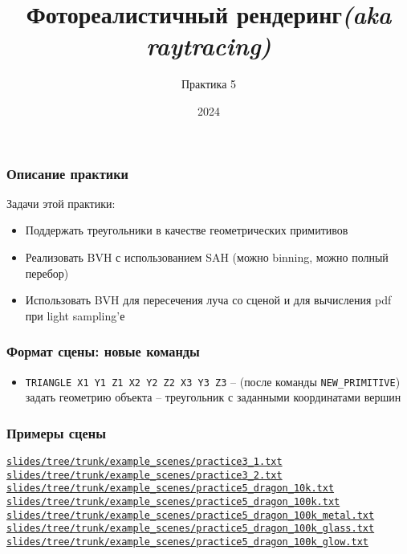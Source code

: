 \documentclass[10pt,handout]{beamer}
\title{Фотореалистичный рендеринг\quad\quad\quad\quad\quad\quad \textit{(aka raytracing)}}
\subtitle{Практика 5}
\date{2024}
\begin{document}
\frame{\titlepage}

\begin{frame}[fragile]
\frametitle{Описание практики}
Задачи этой практики:
\begin{itemize}
\item Поддержать треугольники в качестве геометрических примитивов
\item Реализовать BVH с использованием SAH (можно binning, можно полный перебор)
\item Использовать BVH для пересечения луча со сценой и для вычисления pdf при light sampling'е
\end{itemize}
\end{frame}

\begin{frame}
\frametitle{Формат сцены: новые команды}
\begin{itemize}
\item \texttt{TRIANGLE X1 Y1 Z1 X2 Y2 Z2 X3 Y3 Z3} -- (после команды \texttt{NEW\_PRIMITIVE}) задать геометрию объекта -- треугольник с заданными координатами вершин
\end{itemize}
\end{frame}

\begin{frame}[fragile]
\frametitle{Примеры сцены}
\begin{scriptsize}
\href{https://github.com/lisyarus/raytracing-course-slides/tree/trunk/example_scenes/practice5_1.txt}{\texttt{slides/tree/trunk/example\_scenes/practice3\_1.txt}}
\href{https://github.com/lisyarus/raytracing-course-slides/tree/trunk/example_scenes/practice5_2.txt}{\texttt{slides/tree/trunk/example\_scenes/practice3\_2.txt}}
\href{https://github.com/lisyarus/raytracing-course-slides/tree/trunk/example_scenes/practice5_dragon_10k.txt}{\texttt{slides/tree/trunk/example\_scenes/practice5\_dragon\_10k.txt}}
\href{https://github.com/lisyarus/raytracing-course-slides/tree/trunk/example_scenes/practice5_dragon_100k.txt}{\texttt{slides/tree/trunk/example\_scenes/practice5\_dragon\_100k.txt}}
\href{https://github.com/lisyarus/raytracing-course-slides/tree/trunk/example_scenes/practice5_dragon_100k_metal.txt}{\texttt{slides/tree/trunk/example\_scenes/practice5\_dragon\_100k\_metal.txt}}
\href{https://github.com/lisyarus/raytracing-course-slides/tree/trunk/example_scenes/practice5_dragon_100k_glass.txt}{\texttt{slides/tree/trunk/example\_scenes/practice5\_dragon\_100k\_glass.txt}}
\href{https://github.com/lisyarus/raytracing-course-slides/tree/trunk/example_scenes/practice5_dragon_100k_glow.txt}{\texttt{slides/tree/trunk/example\_scenes/practice5\_dragon\_100k\_glow.txt}}
\end{scriptsize}
\end{frame}
\end{document}
